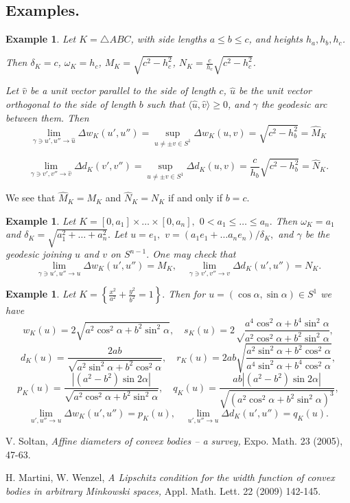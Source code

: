 \documentclass[a4paper,12pt]{amsart}
\newtheorem{exam}[thm]{Example}
\def\om{\omega}
\def\d{\delta}
\begin{document}
\subsection{Examples.}

\begin{exam}
\label{triangle} Let $K=\triangle ABC$, with side lengths $a\le b
\le c$, and heights $h_a, h_b, h_c$.

Then $\d_K=c$, $\omega_K=h_c$, $M_K=\sqrt{c^2-h_c^2}$, $N_K=\frac{c}{h_c}\sqrt{c^2-h_c^2}$.

Let $\hat v$ be a unit vector parallel to the side of length $c$,
$\hat u$ be the unit vector orthogonal to the side of length $b$
such that $\langle \hat u , \hat v\rangle \ge 0$, and $\gamma$ the
geodesic arc between them. Then
$$
\lim_{\gamma\ni u',u''\to \hat u} \Delta w_K(u',u'')= \sup_{u\neq
\pm v \in S^{1} } \Delta w_K(u,v)= \sqrt{c^2-h_b^2}=\hat M_K$$

$$\lim_{\gamma\ni v',v''\to \hat v} \Delta d_K(v',v'')= \sup_{u\neq
\pm v \in S^{1} } \Delta d_K(u,v)=
\frac{c}{h_b}\sqrt{c^2-h_b^2}=\hat N_K.$$

\end{exam}
We see that $\hat M_K=M_K$ and $\hat N_K=N_K$ if and only if $b=c$.

\begin{exam}
\label{box} Let $K=[0,a_1]\times\dots\times[0,a_n],$
$0<a_1\le\dots\le a_n.$ Then $\om_K=a_1$ and
$\delta_K=\sqrt{a_1^2+\dots+a_n^2}.$ Let $u=e_1,$ $v=(a_1e_1+\dots
a_ne_n)/\delta_K,$ and $\gamma$ be the geodesic joining $u$ and
$v$ on $S^{n-1}.$ One may check that
$$
\lim_{\gamma\ni u',u''\to u}\Delta w_K(u',u'')=M_K,\quad
\lim_{\gamma\ni v',v''\to v}\Delta d_K(u',u'')=N_K.
$$
\end{exam}

\begin{exam}
\label{ellipse} Let $\displaystyle K=\left\{\frac{x^2}{a^2}+\frac{y^2}{b^2}=1\right\}.$
Then for $u=(\cos\alpha,\sin\alpha)\in S^1$ we have
$$w_K(u)= 2\sqrt{a^2\cos^2\alpha+b^2\sin^2\alpha},\quad s_K (u)= 2\sqrt
\frac{a^4\cos^2\alpha+b^4\sin^2\alpha}{a^2\cos^2\alpha+b^2\sin^2\alpha},
$$
$$d_K(u)= \frac {2ab}{\sqrt{a^2\sin^2\alpha+b^2\cos^2\alpha}},\quad r_K (u)= 2ab\sqrt
{\frac{a^2\sin^2\alpha+b^2\cos^2\alpha}{a^4\sin^2\alpha+b^4\cos^2\alpha}},
$$
$$p_K(u)=\frac{|(a^2-b^2)\sin2\alpha|}{\sqrt{a^2\cos^2\alpha+b^2\sin^2\alpha}},
\quad q_K(u)=\frac{ab|(a^2-b^2)\sin2\alpha|}{\sqrt{(a^2\cos^2\alpha+b^2\sin^2\alpha)^3}},$$
$$\lim_{u',u''\to u}\Delta w_K(u',u'')=p_K(u),\quad
\lim_{u',u''\to u}\Delta d_K(u',u'')=q_K(u).$$
\end{exam}

\begin{thebibliography}{}

 V. Soltan, {\it Affine diameters of convex bodies -- a survey,}
Expo. Math. 23 (2005), 47-63.

 H. Martini, W. Wenzel, {\it A Lipschitz condition for the width function
of convex bodies in arbitrary Minkowski spaces,} Appl. Math. Lett. 22 (2009) 142-145.

\end{thebibliography}
\end{document}
